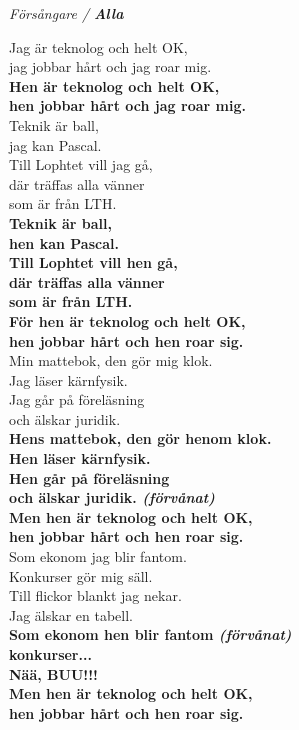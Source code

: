 \documentclass[a6paper,10pt]{article}
\begin{document}
\setlength{\oddsidemargin}{-0.37in}
\noindent
\begin{center}
\textit{Försångare / \textbf{Alla}}
\end{center}
Jag är teknolog och helt OK,\\
jag jobbar hårt och jag roar mig.\\
\textbf{Hen är teknolog och helt OK,\\
hen jobbar hårt och jag roar mig.}
\vspace{5pt}\\
Teknik är ball,\\
jag kan Pascal.\\
Till Lophtet vill jag gå,\\
där träffas alla vänner\\
som är från LTH.
\vspace{5pt}\\
\textbf{Teknik är ball,\\
hen kan Pascal.\\
Till Lophtet vill hen gå,\\
där träffas alla vänner\\
som är från LTH.
\vspace{5pt}\\
För hen är teknolog och helt OK,\\
hen jobbar hårt och hen roar sig.}
\vspace{5pt}\\
Min mattebok, den gör mig klok.\\
Jag läser kärnfysik.\\
Jag går på föreläsning\\
och älskar juridik.
\vspace{5pt}\\
\textbf{Hens mattebok, den gör henom klok.\\
Hen läser kärnfysik.\\
Hen går på föreläsning\\
och älskar juridik. \textit{(förvånat)}
\vspace{5pt}\\
Men hen är teknolog och helt OK,\\
hen jobbar hårt och hen roar sig.}
\vspace{5pt}\\

\newpage
\setlength{\oddsidemargin}{-0.47in}
\noindent
Som ekonom jag blir fantom.\\
Konkurser gör mig säll.\\
Till flickor blankt jag nekar.\\
Jag älskar en tabell.
\vspace{5pt}\\
\textbf{Som ekonom hen blir fantom \textit{(förvånat)}\\
konkurser...\\
Nää, BUU!!!
\vspace{5pt}\\
Men hen är teknolog och helt OK,\\
hen jobbar hårt och hen roar sig.}
\end{document}
